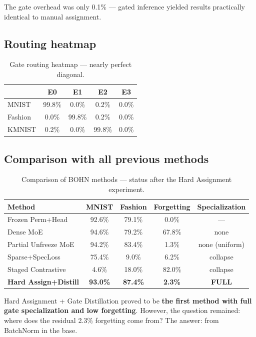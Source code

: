 \documentclass[11pt,a4paper]{report}
\begin{document}
The gate overhead was only 0.1\% --- gated inference yielded results practically identical to manual assignment.

\subsection{Routing heatmap}

\begin{table}[h]
\centering
\caption{Gate routing heatmap --- nearly perfect diagonal.}
\begin{tabular}{l c c c c}
\hline
& \textbf{E0} & \textbf{E1} & \textbf{E2} & \textbf{E3} \\
\hline
MNIST & 99.8\% & 0.0\% & 0.2\% & 0.0\% \\
Fashion & 0.0\% & 99.8\% & 0.2\% & 0.0\% \\
KMNIST & 0.2\% & 0.0\% & 99.8\% & 0.0\% \\
\hline
\end{tabular}
\end{table}

\subsection{Comparison with all previous methods}

\begin{table}[h]
\centering
\caption{Comparison of BOHN methods --- status after the Hard Assignment experiment.}
\begin{tabular}{l c c c c}
\hline
\textbf{Method} & \textbf{MNIST} & \textbf{Fashion} & \textbf{Forgetting} & \textbf{Specialization} \\
\hline
Frozen Perm+Head & 92.6\% & 79.1\% & 0.0\% & --- \\
Dense MoE & 94.6\% & 79.2\% & 67.8\% & none \\
Partial Unfreeze MoE & 94.2\% & 83.4\% & 1.3\% & none (uniform) \\
Sparse+SpecLoss & 75.4\% & 9.0\% & 6.2\% & collapse \\
Staged Contrastive & 4.6\% & 18.0\% & 82.0\% & collapse \\
\textbf{Hard Assign+Distill} & \textbf{93.0\%} & \textbf{87.4\%} & \textbf{2.3\%} & \textbf{FULL} \\
\hline
\end{tabular}
\end{table}

Hard Assignment + Gate Distillation proved to be \textbf{the first method with full gate specialization and low forgetting}. However, the question remained: where does the residual 2.3\% forgetting come from? The answer: from BatchNorm in the base.
\end{document}
